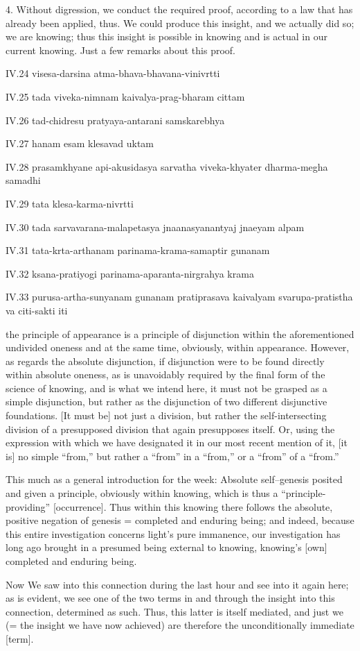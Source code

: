 4. Without digression, we conduct the required proof,
according to a law that has already been applied, thus.
We could produce this insight,
and we actually did so; we are knowing;
thus this insight is possible in knowing
and is actual in our current knowing.
Just a few remarks about this proof.

IV.24
visesa-darsina atma-bhava-bhavana-vinivrtti

IV.25
tada viveka-nimnam kaivalya-prag-bharam cittam

IV.26
tad-chidresu pratyaya-antarani samskarebhya

IV.27
hanam esam klesavad uktam

IV.28
prasamkhyane api-akusidasya sarvatha viveka-khyater dharma-megha samadhi

IV.29
tata klesa-karma-nivrtti

IV.30
tada sarvavarana-malapetasya jnaanasyanantyaj jnaeyam alpam

IV.31
tata-krta-arthanam parinama-krama-samaptir gunanam

IV.32
ksana-pratiyogi parinama-aparanta-nirgrahya krama

IV.33
purusa-artha-sunyanam gunanam pratiprasava kaivalyam
svarupa-pratistha va citi-sakti iti

the principle of appearance is
a principle of disjunction
within the aforementioned undivided oneness
and at the same time, obviously, within appearance.
However, as regards the absolute disjunction,
if disjunction were to be found
directly within absolute oneness,
as is unavoidably required by
the final form of the science of knowing,
and is what we intend here,
it must not be grasped as a simple disjunction,
but rather as the disjunction of
two different disjunctive foundations.
[It must be] not just a division,
but rather the self-intersecting division
of a presupposed division that again presupposes itself.
Or, using the expression with which we have designated it
in our most recent mention of it,
[it is] no simple “from,”
but rather a “from” in a “from,”
or a “from” of a “from.”

This much as a general introduction for the week:
Absolute self–genesis posited
and given a principle,
obviously within knowing,
which is thus a “principle-providing” [occurrence].
Thus within this knowing there follows
the absolute, positive negation of genesis =
completed and enduring being;
and indeed, because this entire investigation
concerns light’s pure immanence,
our investigation has long ago brought in
a presumed being external to knowing,
knowing’s [own] completed and enduring being.

Now We saw into this connection during the last hour
and see into it again here;
as is evident, we see one of the two terms
in and through the insight into this connection,
determined as such.
Thus, this latter is itself mediated,
and just we (= the insight we have now achieved) are
therefore the unconditionally immediate [term].
